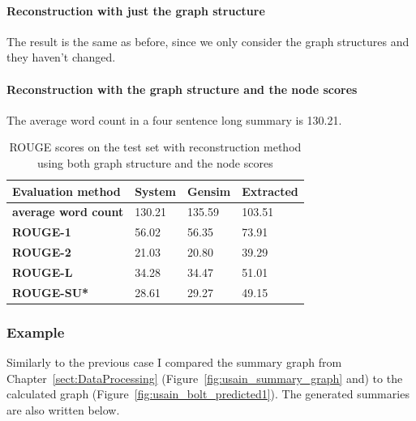 \paragraph{Reconstruction with just the graph structure}

The result is the same as before, since we only consider the graph structures and they haven't changed.

\paragraph{Reconstruction with the graph structure and the node scores}

The average word count in a four sentence long summary is 130.21.

\begin{table}[!ht]
	\centering
	\begin{tabular}{| l | l | l | l |}
	\hline
		\textbf{Evaluation method}&\textbf{System}&\textbf{Gensim}&\textbf{Extracted}\\ \hline \hline
		\textbf{average word count}&130.21&135.59&103.51 \\ \hline
		\textbf{ROUGE-1}&56.02&56.35&73.91 \\ \hline
		\textbf{ROUGE-2}&21.03&20.80&39.29 \\ \hline
		\textbf{ROUGE-L}&34.28&34.47&51.01 \\ \hline
		\textbf{ROUGE-SU*}&28.61&29.27&49.15 \\ \hline
	\end{tabular}
	\caption{ROUGE scores on the test set with reconstruction method using both graph structure and the node scores}
\end{table}

\subsubsection{Example}
Similarly to the previous case I compared the summary graph from Chapter~\ref{sect:DataProcessing} (Figure~\ref{fig:usain_summary_graph} and) to the calculated graph (Figure~\ref{fig:usain_bolt_predicted1}). The generated summaries are also written below.

